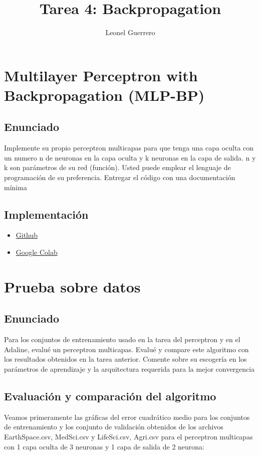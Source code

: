 \documentclass{article}
\title{Tarea 4: Backpropagation}
\author{Leonel Guerrero}
\theoremstyle{mytheoremstyle}
\theoremstyle{mytheoremstyle}
\theoremstyle{myproblemstyle}
\begin{document}
\maketitle


\section{Multilayer Perceptron with Backpropagation (MLP-BP)}

\subsection{Enunciado}
Implemente su propio perceptron multicapas para que tenga una capa oculta con un numero n de neuronas en la capa oculta y k neuronas en la capa de salida. n y k son parámetros de su red (función). Usted puede emplear el lenguaje de programación de su preferencia. Entregar el código con una documentación mínima

\subsection{Implementación}

\begin{itemize}
  \item \href{}{Github}
  \item \href{}{Google Colab}
\end{itemize}

\section{Prueba sobre datos}

\subsection{Enunciado}
Para los conjuntos de entrenamiento usado  en la tarea del perceptron y en el Adaline, evalué un perceptron multicapas. Evalué y compare este algoritmo con los resultados obtenidos en la tarea anterior. Comente sobre su escogería en los parámetros de aprendizaje y la arquitectura requerida para la mejor convergencia

\subsection{Evaluación y comparación del algoritmo}

Veamos primeramente las gráficas del error cuadrático medio para los conjuntos de entrenamiento y los conjunto de validación obtenidos de los archivos EarthSpace.csv, MedSci.csv y LifeSci.csv, Agri.csv para el perceptron multicapas con 1 capa oculta de 3 neuronas y 1 capa de salida de 2 neurona:
\end{document}
